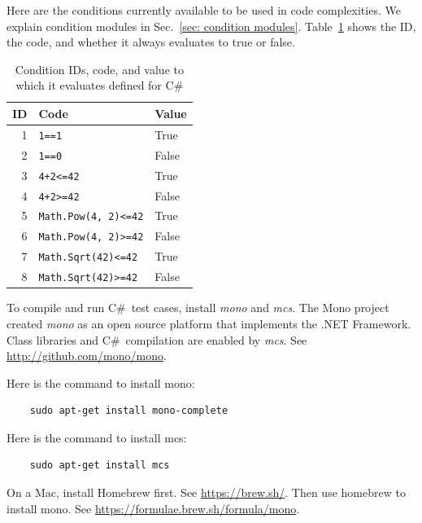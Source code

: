 \documentclass[12pt]{article}
\newcommand{\CSharp}{C{\fontseries{b}\selectfont\#}}
\begin{document}
\newpage

Here are the conditions currently available to be used in code complexities.
We explain condition modules in Sec.~\ref{sec: condition modules}.
Table~\ref{tab:condition IDs for CSharp} shows the ID, the code, and whether it
always evaluates to true or false.

\begin{table}[H]
\centering
\caption{Condition IDs, code, and value to which it evaluates defined for
  \CSharp}
\begin{tabular}{|r|l|l|}
\hline
\textbf{ID} & \textbf{Code} & \textbf{Value} \\
\hline
1 & \verb|1==1| & True \\
\hline
2 & \verb|1==0| & False \\
\hline
3 & \verb|4+2<=42| & True \\
\hline
4 & \verb|4+2>=42| & False \\
\hline
5 & \verb|Math.Pow(4, 2)<=42| & True \\
\hline
6 & \verb|Math.Pow(4, 2)>=42| & False \\
\hline
7 & \verb|Math.Sqrt(42)<=42| & True \\
\hline
8 & \verb|Math.Sqrt(42)>=42| & False \\
\hline
\end{tabular}
\label{tab:condition IDs for CSharp}
\end{table}


\label{sec:run csharp}
To compile and run \CSharp\ test cases, install \emph{mono} and \emph{mcs}.
The Mono project created \emph{mono} as an open source platform that
implements the .NET Framework. Class libraries and \CSharp\ compilation are enabled
by \emph{mcs}. See \href{http://github.com/mono/mono}{http://github.com/mono/mono}.

Here is the command to install mono:

\begin{verbatim}
    sudo apt-get install mono-complete
\end{verbatim}

Here is the command to install mcs:

\begin{verbatim}
    sudo apt-get install mcs
\end{verbatim}

On a Mac, install Homebrew first. See
\href{https://brew.sh/}{https://brew.sh/}.
Then use homebrew to install mono.  See \href{https://formulae.brew.sh/formula/mono}{https://formulae.brew.sh/formula/mono}.
\end{document}
